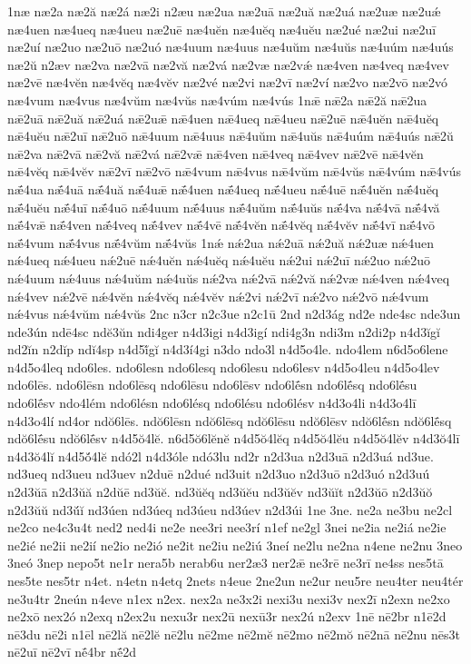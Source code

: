 {1næ
næ2a
næ2ă
næ2á
næ2i
n2æu
næ2ua
næ2uā
næ2uă
næ2uá
næ2uæ
næ2uǽ
næ4uen
næ4ueq
næ4ueu
næ2uē
næ4uĕn
næ4uĕq
næ4uĕu
næ2ué
næ2ui
næ2uī
næ2uí
næ2uo
næ2uō
næ2uó
næ4uum
næ4uus
næ4uŭm
næ4uŭs
næ4uúm
næ4uús
næ2ŭ
n2æv
næ2va
næ2vā
næ2vă
næ2vá
næ2væ
næ2vǽ
næ4ven
næ4veq
næ4vev
næ2vē
næ4vĕn
næ4vĕq
næ4vĕv
næ2vé
næ2vi
næ2vī
næ2ví
næ2vo
næ2vō
næ2vó
næ4vum
næ4vus
næ4vŭm
næ4vŭs
næ4vúm
næ4vús
1nǣ
nǣ2a
nǣ2ă
nǣ2ua
nǣ2uā
nǣ2uă
nǣ2uá
nǣ2uǣ
nǣ4uen
nǣ4ueq
nǣ4ueu
nǣ2uē
nǣ4uĕn
nǣ4uĕq
nǣ4uĕu
nǣ2uī
nǣ2uō
nǣ4uum
nǣ4uus
nǣ4uŭm
nǣ4uŭs
nǣ4uúm
nǣ4uús
nǣ2ŭ
nǣ2va
nǣ2vā
nǣ2vă
nǣ2vá
nǣ2vǣ
nǣ4ven
nǣ4veq
nǣ4vev
nǣ2vē
nǣ4vĕn
nǣ4vĕq
nǣ4vĕv
nǣ2vī
nǣ2vō
nǣ4vum
nǣ4vus
nǣ4vŭm
nǣ4vŭs
nǣ4vúm
nǣ4vús
nǣ́4ua
nǣ́4uā
nǣ́4uă
nǣ́4uǣ
nǣ́4uen
nǣ́4ueq
nǣ́4ueu
nǣ́4uē
nǣ́4uĕn
nǣ́4uĕq
nǣ́4uĕu
nǣ́4uī
nǣ́4uō
nǣ́4uum
nǣ́4uus
nǣ́4uŭm
nǣ́4uŭs
nǣ́4va
nǣ́4vā
nǣ́4vă
nǣ́4vǣ
nǣ́4ven
nǣ́4veq
nǣ́4vev
nǣ́4vē
nǣ́4vĕn
nǣ́4vĕq
nǣ́4vĕv
nǣ́4vī
nǣ́4vō
nǣ́4vum
nǣ́4vus
nǣ́4vŭm
nǣ́4vŭs
1nǽ
nǽ2ua
nǽ2uā
nǽ2uă
nǽ2uæ
nǽ4uen
nǽ4ueq
nǽ4ueu
nǽ2uē
nǽ4uĕn
nǽ4uĕq
nǽ4uĕu
nǽ2ui
nǽ2uī
nǽ2uo
nǽ2uō
nǽ4uum
nǽ4uus
nǽ4uŭm
nǽ4uŭs
nǽ2va
nǽ2vā
nǽ2vă
nǽ2væ
nǽ4ven
nǽ4veq
nǽ4vev
nǽ2vē
nǽ4vĕn
nǽ4vĕq
nǽ4vĕv
nǽ2vi
nǽ2vī
nǽ2vo
nǽ2vō
nǽ4vum
nǽ4vus
nǽ4vŭm
nǽ4vŭs
2nc
n3cr
n2c3ue
n2c1ū
2nd
n2d3ág
nd2e
nde4sc
nde3un
nde3ún
ndē4sc
ndĕ3ŭn
ndi4ger
n4d3igi
n4d3igí
ndi4g3n
ndi3m
n2di2p
n4d3ĭgĭ
nd2ĭn
n2dĭp
ndĭ4sp
n4d5ĭ́gĭ
n4d3í4gi
n3do
ndo3l
n4d5o4le.
ndo4lem
n6d5o6lene
n4d5o4leq
ndo6les.
ndo6lesn
ndo6lesq
ndo6lesu
ndo6lesv
n4d5o4leu
n4d5o4lev
ndo6lēs.
ndo6lēsn
ndo6lēsq
ndo6lēsu
ndo6lēsv
ndo6lḗsn
ndo6lḗsq
ndo6lḗsu
ndo6lḗsv
ndo4lém
ndo6lésn
ndo6lésq
ndo6lésu
ndo6lésv
n4d3o4li
n4d3o4lī
n4d3o4lí
nd4or
ndŏ6lēs.
ndŏ6lēsn
ndŏ6lēsq
ndŏ6lēsu
ndŏ6lēsv
ndŏ6lḗsn
ndŏ6lḗsq
ndŏ6lḗsu
ndŏ6lḗsv
n4d5ŏ4lĕ.
n6d5ŏ6lĕnĕ
n4d5ŏ4lĕq
n4d5ŏ4lĕu
n4d5ŏ4lĕv
n4d3ŏ4lī
n4d3ŏ4lĭ
n4d5ŏ́4lĕ
ndó2l
n4d3óle
ndó3lu
nd2r
n2d3ua
n2d3uā
n2d3uá
nd3ue.
nd3ueq
nd3ueu
nd3uev
n2duē
n2dué
nd3uit
n2d3uo
n2d3uō
n2d3uó
n2d3uú
n2d3ŭā
n2d3ŭă
n2dŭē
nd3ŭĕ.
nd3ŭĕq
nd3ŭĕu
nd3ŭĕv
nd3ŭĭt
n2d3ŭō
n2d3ŭŏ
n2d3ŭŭ
nd3ŭ́ĭ
nd3úen
nd3úeq
nd3úeu
nd3úev
n2d3úi
1ne
3ne.
ne2a
ne3bu
ne2cl
ne2co
ne4c3u4t
ned2
ned4i
ne2e
nee3ri
nee3rí
n1ef
ne2gl
3nei
ne2ia
ne2iá
ne2ie
ne2ié
ne2ii
ne2ií
ne2io
ne2ió
ne2it
ne2iu
ne2iú
3neí
ne2lu
ne2na
n4ene
ne2nu
3neo
3neó
3nep
nepo5t
ne1r
nera5b
nerab6u
ner2æ3
ner2ǣ
ne3rē
ne3rī
ne4ss
nes5tā
nes5te
nes5tr
n4et.
n4etn
n4etq
2nets
n4eue
2ne2un
ne2ur
neu5re
neu4ter
neu4tér
ne3u4tr
2neún
n4eve
n1ex
n2ex.
nex2a
ne3x2i
nexi3u
nexi3v
nex2ī
n2exn
ne2xo
ne2xō
nex2ó
n2exq
n2ex2u
nexu3r
nex2ū
nexū3r
nex2ú
n2exv
1nē
nē2br
n1ē2d
nē3du
nē2i
n1ēl
nē2lă
nē2lĕ
nē2lu
nē2me
nē2mĕ
nē2mo
nē2mŏ
nē2nā
nē2nu
nēs3t
nē2uī
nē2vī
nḗ4br
nḗ2d
}
